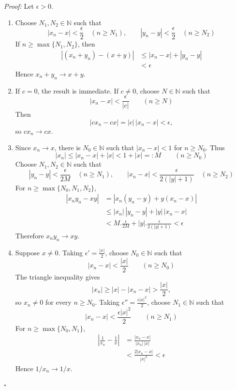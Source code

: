 \documentclass[a4paper,11pt,abstracton]{scrartcl}
\newcommand{\NN}{\mathbb{N}}
\theoremstyle{dotlessP}
\theoremstyle{dotlessS}
\theoremstyle{remark}
\theoremstyle{definition}
\begin{document}
\begin{claim_box}
\textit{Proof:}
Let $\epsilon>0$.

\begin{enumerate}
    \item Choose $N_1,N_2\in\NN$ such that
    \[
        |x_n-x|<\frac{\epsilon}{2}\quad(n\ge N_1),
        \qquad
        |y_n-y|<\frac{\epsilon}{2}\quad(n\ge N_2)
    \]
    If $n\ge\max\{N_1,N_2\}$, then
    \[
    \begin{aligned}
        |(x_n+y_n)-(x+y)|
        &\le |x_n-x|+|y_n-y|\\
        &<\epsilon
    \end{aligned}
    \]
    Hence $x_n+y_n\to x+y$.

    \item If $c=0$, the result is immediate. If $c\ne0$, choose
    $N\in\NN$ such that
    \[
        |x_n-x|<\frac{\epsilon}{|c|}\qquad(n\ge N)
    \]
    Then
    \[
        |cx_n-cx|=|c|\,|x_n-x|<\epsilon,
    \]
    so $cx_n\to cx$.

    \item Since $x_n\to x$, there is $N_0\in\NN$ such that
    $|x_n-x|<1$ for $n\ge N_0$. Thus
    \[
        |x_n|\le |x_n-x|+|x|<1+|x|=:M
        \qquad(n\ge N_0)
    \]
    Choose $N_1,N_2\in\NN$ such that
    \[
        |y_n-y|<\frac{\epsilon}{2M}\quad(n\ge N_1),
        \qquad
        |x_n-x|<\frac{\epsilon}{2(|y|+1)}\quad(n\ge N_2)
    \]
    For $n\ge\max\{N_0,N_1,N_2\}$,
    \[
    \begin{aligned}
        |x_ny_n-xy|
        &=|x_n(y_n-y)+y(x_n-x)|\\
        &\le |x_n|\,|y_n-y|+|y|\,|x_n-x|\\
        &<M.\frac{\epsilon}{2M}
          +|y|.\frac{\epsilon}{2(|y|+1)}
        <\epsilon
    \end{aligned}
    \]
    Therefore $x_ny_n\to xy$.

    \item Suppose $x\ne0$. Taking $\epsilon' = \frac{|x|}{2}$, choose $N_0\in\NN$ such that
    \[
        |x_n-x|<\frac{|x|}{2}\qquad(n\ge N_0)
    \]
    The triangle inequality gives
    \[
        |x_n|\ge |x|-|x_n-x|>\frac{|x|}{2},
    \]
    so $x_n\ne0$ for every $n\ge N_0$. Taking $\epsilon''=\frac{\epsilon |x|^2}{2}$, choose $N_1\in\NN$ such that
    \[
        |x_n-x|<\frac{\epsilon |x|^2}{2}
        \qquad(n\ge N_1)
    \]
    For $n\ge\max\{N_0,N_1\}$,
    \[
    \begin{aligned}
        \left|\frac{1}{x_n}-\frac{1}{x}\right|
        &=\frac{|x_n-x|}{|x_n|\,|x|}\\
        &<\frac{2|x_n-x|}{|x|^2}
        <\epsilon
    \end{aligned}
    \]
    Hence $1/x_n\to1/x$. 
\end{enumerate}
\hfill$\square$
\end{claim_box}
\end{document}
